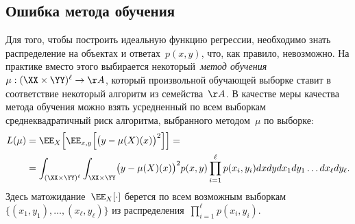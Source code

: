 \documentclass[12pt,fleqn]{article}
\begin{document}
\subsection{Ошибка метода обучения}
Для того, чтобы построить идеальную функцию регрессии, необходимо
знать распределение на объектах и ответах~$p(x, y)$, что, как правило, невозможно.
На практике вместо этого выбирается некоторый~\emph{метод обучения}~$\mu: (\XX \times \YY)^\ell \to \AA$,
который произвольной обучающей выборке ставит в соответствие
некоторый алгоритм из семейства~$\AA$.
В качестве меры качества метода обучения можно взять усредненный по всем выборкам
среднеквадратичный риск алгоритма, выбранного методом~$\mu$ по выборке:
\begin{align}
\label{eq:learnMethodLoss}
    L(\mu)
    &=
    \EE_{X} \Bigl[
        \EE_{x, y} \Bigl[
            \bigl(
            y - \mu(X)(x)
            \bigr)^2
        \Bigr]
    \Bigr]
    =\\ \notag
    &=
    \int_{(\XX \times \YY)^\ell}
    \int_{\XX \times \YY}
        \bigl(
        y - \mu(X)(x)
        \bigr)^2
        p(x, y)
        \prod_{i = 1}^{\ell}
            p(x_i, y_i)
    dx dy
    dx_1 dy_1
    \dots
    dx_\ell dy_\ell
    .
\end{align}
Здесь матожидание~$\EE_{X} [\cdot]$ берется по всем
возможным выборкам~$\{(x_1, y_1), \dots, (x_\ell, y_\ell)\}$
из распределения~$\prod_{i = 1}^{\ell} p(x_i, y_i)$.
\end{document}
